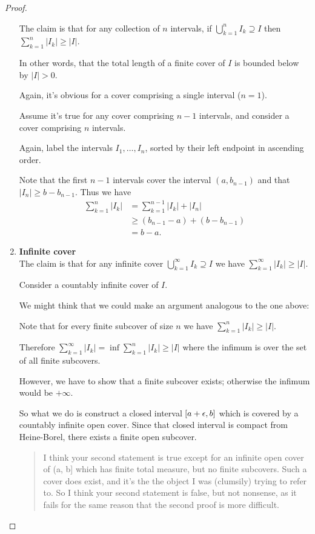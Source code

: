 \begin{proof}
\begin{enumerate}
    The claim is that for any collection of $n$ intervals, if $\bigcup_{k=1}^n I_k \supseteq I$
    then $\sum_{k=1}^n |I_k| \geq |I|$.

    In other words, that the total length of a finite cover of $I$ is bounded below by $|I| > 0$.

    Again, it's obvious for a cover comprising a single interval ($n=1$).

    Assume it's true for any cover comprising $n-1$ intervals, and consider a cover comprising $n$ intervals.

    Again, label the intervals $I_1, \ldots, I_n$, sorted by their left endpoint in ascending order.

    Note that the first $n-1$ intervals cover the interval $(a, b_{n-1})$ and that $|I_n| \geq b - b_{n-1}$.
    Thus we have
    \begin{align*}
      \sum_{k=1}^n |I_k|
      &= \sum_{k=1}^{n-1}|I_k| + |I_n| \\
      &\geq (b_{n-1} - a) + (b - b_{n-1}) \\
      &= b - a.
    \end{align*}

  \item {\bf Infinite cover}\\

    The claim is that for any infinite cover $\bigcup_{k=1}^\infty I_k \supseteq I$ we have $\sum_{k=1}^\infty |I_k| \geq |I|$.

    Consider a countably infinite cover of $I$.

    We might think that we could make an argument analogous to the one above:

    Note that for every finite subcover of size $n$ we have $\sum_{k=1}^n |I_k| \geq |I|$.

    Therefore $\sum_{k=1}^\infty |I_k| = \inf \sum_{k=1}^n |I_k|  \geq |I|$ where the infimum is over the set of all finite subcovers.

    However, we have to show that a finite subcover exists; otherwise the infimum would be $+\infty$.

    So what we do is construct a closed interval $[a + \epsilon, b]$ which is covered by a countably infinite open
    cover. Since that closed interval is compact from Heine-Borel, there exists a finite open subcover.

    \begin{quote}
      I think your second statement is true except for an infinite open cover of (a, b] which has finite total
      measure, but no finite subcovers. Such a cover does exist, and it’s the the object I was (clumsily)
      trying to refer to. So I think your second statement is false, but not nonsense, as it fails for the same
      reason that the second proof is more difficult.
    \end{quote}
  \end{enumerate}
\end{proof}


